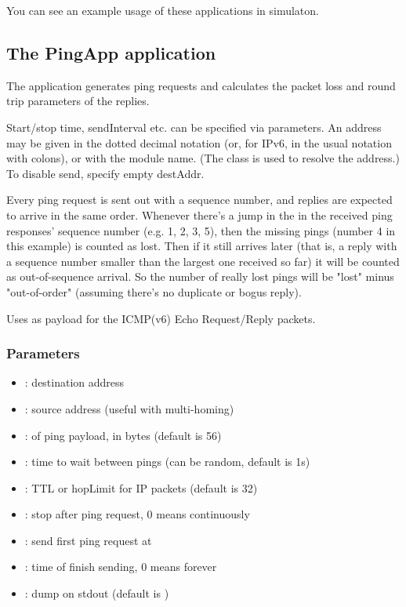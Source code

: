You can see an example usage of these applications in 
simulaton.

\subsection{The PingApp application}

The  application
generates ping requests and calculates the packet loss and round trip
parameters of the replies.

Start/stop time, sendInterval etc. can be specified via parameters. An address
may be given in the dotted decimal notation (or, for IPv6, in the usual
notation with colons), or with the module name.
(The  class is used to resolve the address.)
To disable send, specify empty destAddr.

Every ping request is sent out with a sequence number, and replies are
expected to arrive in the same order. Whenever there's a jump in the
in the received ping responses' sequence number (e.g. 1, 2, 3, 5), then
the missing pings (number 4 in this example) is counted as lost.
Then if it still arrives later (that is, a reply with a sequence number
smaller than the largest one received so far) it will be counted as
out-of-sequence arrival. So the number of really lost pings will be
"lost" minus "out-of-order" (assuming there's no duplicate or bogus reply).

Uses  as payload for the ICMP(v6) Echo Request/Reply packets.

\subsubsection*{Parameters}

\begin{itemize}
  \item {}: destination address
  \item {}: source address (useful with multi-homing)
  \item {}: of ping payload, in bytes (default is 56)
  \item {}: time to wait between pings (can be random, default is 1s)
  \item {}: TTL or hopLimit for IP packets (default is 32)
  \item {}: stop after  ping request, 0 means continuously
  \item {}: send first ping request at 
  \item {}: time of finish sending, 0 means forever
  \item {}: dump on stdout (default is )
\end{itemize}


